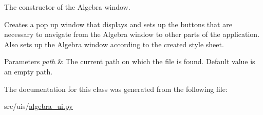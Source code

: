 The constructor of the Algebra window. 

Creates a pop up window that displays and sets up the buttons that are necessary to navigate from the Algebra window to other parts of the application. Also sets up the Algebra window according to the created style sheet. 
\begin{DoxyParams}{Parameters}
{\em path} & The current path on which the file is found. Default value is an empty path. \\
\hline
\end{DoxyParams}


The documentation for this class was generated from the following file\+:\begin{DoxyCompactItemize}
\item 
src/uis/\hyperlink{algebra__ui_8py}{algebra\+\_\+ui.\+py}\end{DoxyCompactItemize}
